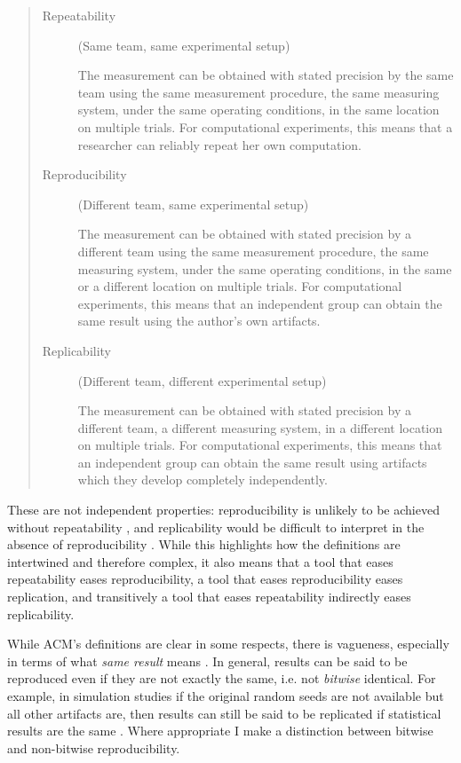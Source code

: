 \documentclass[logo,msc,dsti]{style/infthesis}    %
\begin{document}
\begin{quote}
\begin{description}
\item[Repeatability] (Same team, same experimental setup)

The measurement can be obtained with stated precision by the same team using the same measurement procedure, the same measuring system, under the same operating conditions, in the same location on multiple trials. For computational experiments, this means that a researcher can reliably repeat her own computation.
\item[Reproducibility] (Different team, same experimental setup)

The measurement can be obtained with stated precision by a different team using the same measurement procedure, the same measuring system, under the same operating conditions, in the same or a different location on multiple trials. For computational experiments, this means that an independent group can obtain the same result using the author’s own artifacts.

\item[Replicability] (Different team, different experimental setup)

The measurement can be obtained with stated precision by a different team, a different measuring system, in a different location on multiple trials. For computational experiments, this means that an independent group can obtain the same result using artifacts which they develop completely independently.
\end{description}
\end{quote}

These are not independent properties: reproducibility is unlikely to be achieved without repeatability \cite{hill2022reproducibility}, and replicability would be difficult to interpret in the absence of reproducibility \cite{nuijten2018verify}. While this highlights how the definitions are intertwined and therefore complex, it also means that a tool that eases repeatability eases reproducibility, a tool that eases reproducibility eases replication, and transitively a tool that eases repeatability indirectly eases replicability.

While ACM's definitions are clear in some respects, there is vagueness, especially in terms of what \emph{same result} means \cite{hill2022reproducibility}. In general, results can be said to be reproduced even if they are not exactly the same, i.e. not \emph{bitwise} identical. For example, in simulation studies if the original random seeds are not available but all other artifacts are, then results can still be said to be replicated if statistical results are the same \cite{luijken2024replicability}. Where appropriate I make a distinction between bitwise and non-bitwise reproducibility.
\end{document}
